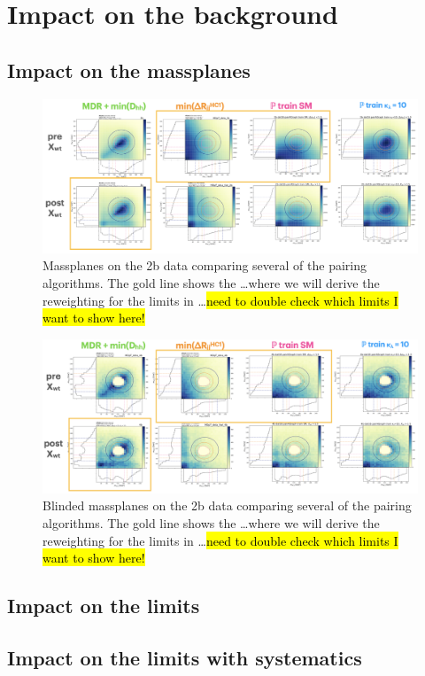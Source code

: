\section{Impact on the background}

\subsection{Impact on the massplanes}

\begin{figure}
\includegraphics[width=\textwidth]{figures/pairAGraph/massplaes-2b}
\caption{Massplanes on the 2b data comparing several of the pairing algorithms. The gold line shows the \ldots where we will derive the reweighting for the limits in \ldots \hl{need to double check which limits I want to show here!}}
\label{fig:pag-mp-2b}
\end{figure}

\begin{figure}
\includegraphics[width=\textwidth]{figures/pairAGraph/massplaes-4b}
\caption{Blinded massplanes  on the 2b data comparing several of the pairing algorithms. The gold line shows the \ldots where we will derive the reweighting for the limits in \ldots \hl{need to double check which limits I want to show here!}}
\label{fig:pag-mp-4b}
\end{figure}



\subsection{Impact on the limits}

\subsection{Impact on the limits with systematics}


